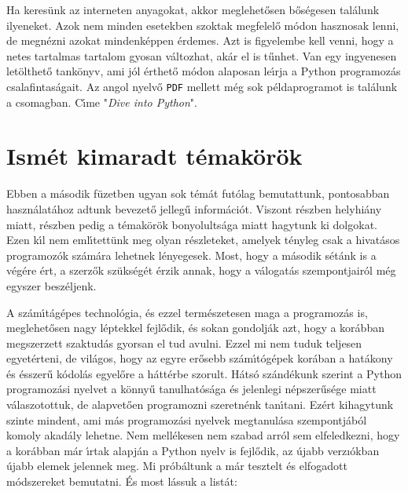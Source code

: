 Ha keres\"unk az interneten anyagokat, akkor meglehet\H{o}sen b\H{o}s\'egesen ta\-l\'a\-lunk ilyeneket. 
Azok nem minden esetekben szoktak megfelel\H{o} m\'odon hasznosak lenni, de megn\'ezni azokat mindenk\'eppen 
\'erdemes. Azt is figyelembe kell venni, hogy a netes tartalmas tartalom gyosan v\'altozhat, ak\'ar 
el is t\H{u}nhet. Van egy ingyenesen let\"olthet\H{o} tank\"onyv, ami j\'ol \'erthet\H{o} m\'odon 
alaposan le\'{\i}rja a Python programoz\'as csalafintas\'agait. Az angol nyelv\H{o} {\tt PDF} mellett 
m\'eg sok p\'eldaprogramot is tal\'alunk a csomagban. C\'{\i}me "{\it Dive into Python}".

\setcounter{section}{10}
\section{Ism\'et kimaradt t\'emak\"or\"ok}

Ebben a m\'asodik f\"uzetben ugyan sok t\'em\'at fut\'olag bemutattunk, pontosabban haszn\'alat\'ahoz adtunk 
bevezet\H{o} jelleg\H{u} inform\'aci\'ot. Viszont r\'eszben helyhi\'any miatt, r\'eszben pedig a t\'emak\"or\"ok 
bonyolults\'aga miatt hagytunk ki dolgokat. Ezen k\'{\i}l nem eml\'{\i}tett\"unk meg olyan r\'eszleteket, amelyek 
t\'enyleg csak a hivat\'asos programoz\'ok sz\'am\'ara lehetnek l\'enyegesek. Most, hogy a m\'asodik s\'et\'ank 
is a v\'eg\'ere \'ert, a szerz\H{o}k sz\"uks\'eg\'et \'erzik annak, hogy a v\'alogat\'as szempontjair\'ol m\'eg 
egyszer besz\'eljenk. 

A sz\'am\'{\i}t\'ag\'epes technol\'ogia, \'es ezzel term\'eszetesen maga a programoz\'as is, meglehet\H{o}sen 
nagy l\'eptekkel fejl\H{o}dik, \'es sokan gondolj\'ak azt, hogy a kor\'abban megszerzett szaktud\'as 
gyorsan el tud avulni. Ezzel mi nem tuduk teljesen egyet\'erteni, de vil\'agos, hogy az egyre er\H{o}sebb 
sz\'am\'{\i}t\'og\'epek kor\'aban a hat\'akony \'es \'esszer\H{u} k\'odol\'as egyel\H{o}re a h\'att\'erbe 
szorult. H\'ats\'o sz\'and\'ekunk szerint a Python programoz\'asi nyelvet a k\"onny\H{u} tanulhat\'os\'aga \'es 
jelenlegi n\'epszer\H{u}s\'ege miatt v\'alaszotottuk, de alapvet\H{o}en programozni szeretn\'enk tan\'{\i}tani. 
Ez\'ert kihagytunk szinte mindent, ami m\'as programoz\'asi nyelvek megtanul\'asa szempontj\'ab\'ol komoly 
akad\'aly lehetne. Nem mell\'ekesen nem szabad arr\'ol sem elfeledkezni, hogy a kor\'abban m\'ar \'{\i}rtak 
alapj\'an a Python nyelv is fejl\H{o}dik, az \'ujabb verz\i\'okban \'ujabb elemek jelennek meg. Mi pr\'ob\'altunk 
a m\'ar tesztelt \'es elfogadott m\'odszereket bemutatni. \'Es most l\'assuk a list\'at:

